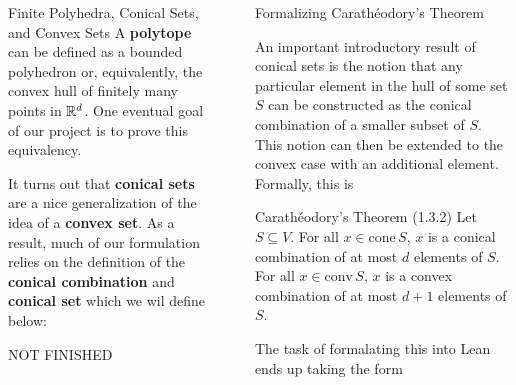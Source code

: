 \documentclass[final]{beamer}
\newlength{\sepwidth}
\newlength{\colwidth}
\newcommand{\separatorcolumn}{\begin{column}{\sepwidth}\end{column}}
\begin{document}
\begin{frame}[fragile]
\begin{columns}[t]
\begin{column}{\colwidth}
\begin{block}{Finite Polyhedra, Conical Sets, and Convex Sets}
                A \textbf{polytope} can be defined as a bounded polyhedron or, equivalently, the convex hull of finitely many points in $\mathbb{R}^d$. One eventual goal of our project is to prove this equivalency. 
                
                It turns out that \textbf{conical sets} are a nice generalization of the idea of a \textbf{convex set}. As a result, much of our formulation relies on the definition of the \textbf{conical combination} and \textbf{conical set} which we wil define below:
                
                NOT FINISHED
                               
            \end{block}
           
            
        \end{column}

        \separatorcolumn

        \begin{column}{\colwidth}

            \begin{block*}


            \end{block*}

            \begin{block}{Formalizing Carath\'eodory's Theorem}

              An important introductory result of conical sets is the notion that any particular element in the hull of some set $S$ can be constructed as the conical combination of a smaller subset of $S$. This notion can then be extended to the convex case with an additional element. Formally, this is
            \end{block}
            \begin{alertblock}{Carath\'eodory's Theorem (1.3.2)}
                Let $S \subseteq V$. For all $x \in \text{cone}\,S$, $x$ is a conical combination of at most $d$ elements of $S$. For all $x \in \text{conv}\,S$, $x$ is a convex combination of at most $d + 1$ elements of $S$. 
              \end{alertblock}
            \begin{block*}
              The task of formalating this into Lean ends up taking the form
              \begin{verbatim}
                
              \end{verbatim}


\end{block*}
\end{column}
\end{columns}
\end{frame}
\end{document}
